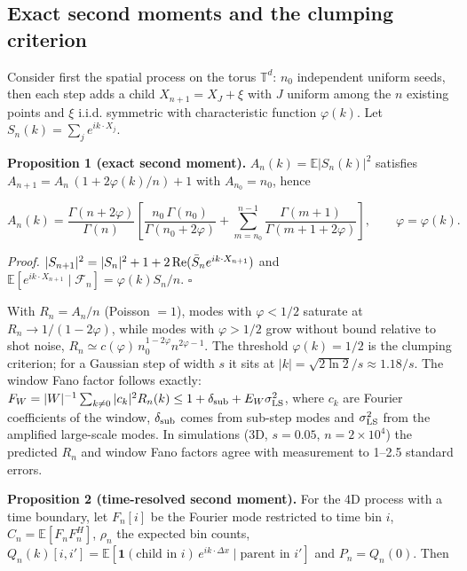 \hypertarget{exact-second-moments-and-the-clumping-criterion}{%
\subsection{Exact second moments and the clumping
criterion}\label{exact-second-moments-and-the-clumping-criterion}}

Consider first the spatial process on the torus
\(\mathbb{T}^d\): \(n_0\) independent uniform seeds, then
each step adds a child \(X_{n+1}=X_J+\xi\) with \(J\)
uniform among the \(n\) existing points and \(\xi\) i.i.d.
symmetric with characteristic function \(\varphi(k)\). Let
\(S_n(k)=\sum_j e^{ik\cdot X_j}\).

\textbf{Proposition 1 (exact second moment).}
\(A_n(k)=\mathbb{E}|S_n(k)|^2\) satisfies
\(A_{n+1}=A_n\,(1+2\varphi(k)/n)+1\) with \(A_{n_0}=n_0\),
hence

\[A_n(k)=\frac{\Gamma(n+2\varphi)}{\Gamma(n)}\left[\frac{n_0\,\Gamma(n_0)}{\Gamma(n_0+2\varphi)}+\sum_{m=n_0}^{n-1}\frac{\Gamma(m+1)}{\Gamma(m+1+2\varphi)}\right],\qquad \varphi=\varphi(k).\]

\emph{Proof.}
\(|S_{n+1}|^2=|S_n|^2+1+2\,{\rm Re}(\bar S_n e^{ik\cdot X_{n+1}})\)
and
\(\mathbb{E}[e^{ik\cdot X_{n+1}}\mid\mathcal{F}_n]=\varphi(k)S_n/n\).
\(\square\)

With \(R_n=A_n/n\) (Poisson \(=1\)), modes with
\(\varphi<1/2\) saturate at \(R_n\to1/(1-2\varphi)\), while
modes with \(\varphi>1/2\) grow without bound relative to
shot noise,
\(R_n\simeq c(\varphi)\,n_0^{1-2\varphi}n^{2\varphi-1}\).
The threshold \(\varphi(k)=1/2\) is the clumping criterion;
for a Gaussian step of width \(s\) it sits at
\(|k|=\sqrt{2\ln2}/s\approx1.18/s\). The window Fano factor
follows exactly:
\(F_W=|W|^{-1}\sum_{k\neq0}|c_k|^2R_n(k)\le1+\delta_{\rm sub}+E_W\sigma^2_{\rm LS}\),
where \(c_k\) are Fourier coefficients of the window,
\(\delta_{\rm sub}\) comes from sub-step modes and
\(\sigma^2_{\rm LS}\) from the amplified large-scale modes.
In simulations (3D, \(s=0.05\), \(n=2\times10^4\)) the
predicted \(R_n\) and window Fano factors agree with
measurement to 1--2.5 standard errors.

\textbf{Proposition 2 (time-resolved second moment).} For
the 4D process with a time boundary, let \(F_n[i]\) be the
Fourier mode restricted to time bin \(i\),
\(C_n=\mathbb{E}[F_nF_n^{H}]\), \(\rho_n\) the expected bin
counts,
\(Q_n(k)[i,i']=\mathbb{E}[\mathbf 1(\text{child in }i)\,e^{ik\cdot\Delta x}\mid\text{parent in }i']\)
and \(P_n=Q_n(0)\). Then

